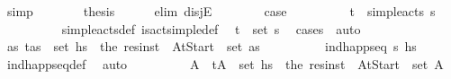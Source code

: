 \begin{isabellebody}
\ simp\isanewline
\ \ \ \ \isamarkupfalse%
\ \isamarkupfalse%
\ {\isacharquery}{\kern0pt}thesis\isanewline
\ \ \ \ \isamarkupfalse%
\ {\isacharparenleft}{\kern0pt}elim\ disjE{\isacharparenright}{\kern0pt}\isanewline
\ \ \ \ \ \ \isamarkupfalse%
\ {\isacharquery}{\kern0pt}case{}\isanewline
\ \ \ \ \ \ \isamarkupfalse%
\ \isamarkupfalse%
\ {\isachardoublequoteopen}{\isacharparenleft}{\kern0pt}t\isactrlsub {\isasympi}{\isacharcomma}{\kern0pt}{\isasympi}{\isacharparenright}{\kern0pt}\ {\isasymin}\ simple{\isacharunderscore}{\kern0pt}acts\ {\isasympi}s{\isachardoublequoteclose}\isanewline
\ \ \ \ \ \ \ \ \isamarkupfalse%
\ simple{\isacharunderscore}{\kern0pt}acts{\isacharunderscore}{\kern0pt}def\ is{\isacharunderscore}{\kern0pt}act{\isacharunderscore}{\kern0pt}simple{\isacharunderscore}{\kern0pt}def\ \isamarkupfalse%
\ {\isacartoucheopen}{\isacharparenleft}{\kern0pt}t\isactrlsub {\isasympi}{\isacharcomma}{\kern0pt}{\isasympi}{\isacharparenright}{\kern0pt}\ {\isasymin}\ set\ {\isasympi}s{\isacartoucheclose}\ \isamarkupfalse%
\ {\isacharparenleft}{\kern0pt}cases\ {\isasympi}{\isacharparenright}{\kern0pt}\ auto\isanewline
\ \ \ \ \ \ \isamarkupfalse%
\ \isamarkupfalse%
\ {\isachardoublequoteopen}{\isasymexists}as{\isachardot}{\kern0pt}\ {\isacharparenleft}{\kern0pt}t\isactrlsub {\isasympi}{\isacharcomma}{\kern0pt}as{\isacharparenright}{\kern0pt}\ {\isasymin}\ set\ hs\ {\isasymand}\ the\ {\isacharparenleft}{\kern0pt}res{\isacharunderscore}{\kern0pt}inst\ {\isasympi}\ At{\isacharunderscore}{\kern0pt}Start{\isacharparenright}{\kern0pt}\ {\isasymin}\ set\ as{\isachardoublequoteclose}\isanewline
\ \ \ \ \ \ \ \ \isamarkupfalse%
\ {\isacartoucheopen}ind{\isacharunderscore}{\kern0pt}happ{\isacharunderscore}{\kern0pt}seq\ {\isasympi}s\ hs\ \isamarkupfalse%
\ ind{\isacharunderscore}{\kern0pt}happ{\isacharunderscore}{\kern0pt}seq{\isacharunderscore}{\kern0pt}def\ \isamarkupfalse%
\ auto\isanewline
\ \ \ \ \ \ \isamarkupfalse%
\ \isamarkupfalse%
\ A{\isacharprime}{\kern0pt}\ \ {\isachardoublequoteopen}{\isacharparenleft}{\kern0pt}t\isactrlsub {\isasympi}{\isacharcomma}{\kern0pt}A{\isacharprime}{\kern0pt}{\isacharparenright}{\kern0pt}\ {\isasymin}\ set\ hs\ \ {\isachardoublequoteopen}the\ {\isacharparenleft}{\kern0pt}res{\isacharunderscore}{\kern0pt}inst\ {\isasympi}\ At{\isacharunderscore}{\kern0pt}Start{\isacharparenright}{\kern0pt}\ {\isasymin}\ set\ A{\isacharprime}{\kern0pt}{\isachardoublequoteclose}\ \isanewline

\end{isabellebody}
